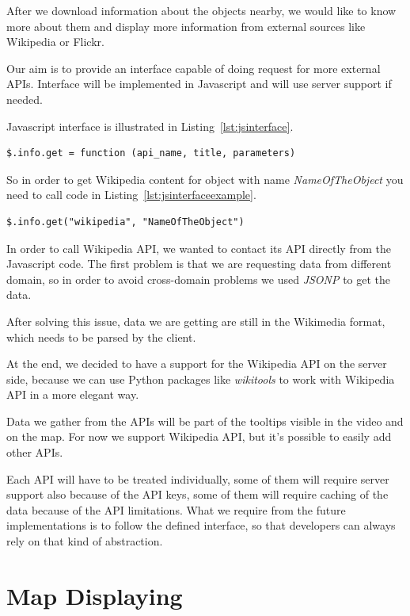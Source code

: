 \documentclass[journal]{IEEEtran}
\begin{document}
After we download information about the objects nearby, we would like to know more about them and display more information from external sources like Wikipedia or Flickr.

Our aim is to provide an interface capable of doing request for more external APIs. Interface will be implemented in Javascript and will use server support if needed.

Javascript interface is illustrated in Listing~\ref{lst:jsinterface}.

\begin{lstlisting}[caption={Javascript~interface~for~connecting~external~API},label={lst:jsinterface}]
$.info.get = function (api_name, title,	parameters)
\end{lstlisting}

So in order to get Wikipedia content for object with name \textit{NameOfTheObject} you need to call code in Listing~\ref{lst:jsinterfaceexample}.

\begin{lstlisting}[caption={Getting Wikipedia content},label={lst:jsinterfaceexample}]
$.info.get("wikipedia", "NameOfTheObject")
\end{lstlisting}

In order to call Wikipedia API, we wanted to contact its API directly from the Javascript code. The first problem is that we are requesting data from different domain, so in order to avoid cross-domain problems we used \textit{JSONP} to get the data.

After solving this issue, data we are getting are still in the Wikimedia format, which needs to be parsed by the client.

At the end, we decided to have a support for the Wikipedia API on the server side, because we can use Python packages like \textit{wikitools} to work with Wikipedia API in a more elegant way.

Data we gather from the APIs will be part of the tooltips visible in the video and on the map. For now we support Wikipedia API, but it's possible to easily add other APIs.

Each API will have to be treated individually, some of them will require server support also because of the API keys, some of them will require caching of the data because of the API limitations. What we require from the future implementations is to follow the defined interface, so that developers can always rely on that kind of abstraction.

\section{Map Displaying}
\end{document}

